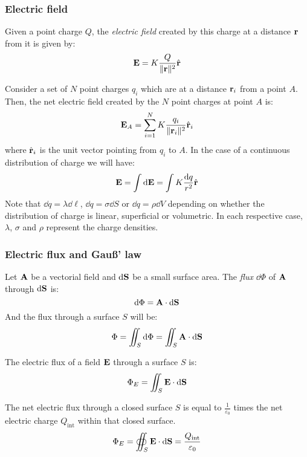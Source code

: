 \documentclass[../../../main.tex]{subfiles}
\begin{document}
\begin{multicols}{2}
  \subsubsection{Electric field}
  \begin{definition}
    Given a point charge $Q$, the \emph{electric field} created by this charge at a distance $\boldsymbol{\mathrm{r}}$ from it is given by:
    $$\boldsymbol{\mathrm{E}}=K\frac{Q}{\|\boldsymbol{\mathrm{r}}\|^2}\hat{\boldsymbol{\mathrm{r}}}$$
  \end{definition}
  \begin{principle}
    Consider a set of $N$ point charges $q_i$ which are at a distance $\boldsymbol{\mathrm{r}}_i$ from a point $A$. Then, the net electric field created by the $N$ point charges at point $A$ is:
    $$\boldsymbol{\mathrm{E}}_A=\sum_{i=1}^NK\frac{q_i}{\|\boldsymbol{\mathrm{r}}_{i}\|^2}\hat{\boldsymbol{\mathrm{r}}}_{i}$$ where $\hat{\boldsymbol{\mathrm{r}}}_{i}$ is the unit vector pointing from $q_i$ to $A$. In the case of a continuous distribution of charge we will have:
    $$\boldsymbol{\mathrm{E}}=\int\dd{\boldsymbol{\mathrm{E}}}=\int K\frac{\dd{q}}{r^2}\hat{\boldsymbol{\mathrm{r}}}$$
    Note that $\dd{q}=\lambda\dd{\ell}$, $\dd{q}=\sigma\dd{S}$ or $\dd{q}=\rho\dd{V}$ depending on whether the distribution of charge is linear, superficial or volumetric. In each respective case, $\lambda$, $\sigma$ and $\rho$ represent the charge densities.
  \end{principle}
  \subsubsection{Electric flux and Gau\ss' law}
  \begin{definition}
    Let $\boldsymbol{\mathrm{A}}$ be a vectorial field and $\dd{\boldsymbol{\mathrm{S}}}$ be a small surface area. The \emph{flux} $\dd{\Phi}$ of $\boldsymbol{\mathrm{A}}$ through $\dd{\boldsymbol{\mathrm{S}}}$ is:
    $$\dd{\Phi}=\boldsymbol{\mathrm{A}}\cdot\dd{\boldsymbol{\mathrm{S}}}$$ And the flux through a surface $S$ will be:
    $$\Phi=\iint_S \dd{\Phi}=\iint_S\boldsymbol{\mathrm{A}}\cdot \dd{\boldsymbol{\mathrm{S}}}$$
  \end{definition}
  \begin{corollary}
    The electric flux of a field $\boldsymbol{\mathrm{E}}$ through a surface $S$ is:
    $$\Phi_E=\iint_S\boldsymbol{\mathrm{E}}\cdot \dd{\boldsymbol{\mathrm{S}}}$$
  \end{corollary}
  \begin{law}
    The net electric flux through a closed surface $S$ is equal to $\frac{1}{\varepsilon_0}$ times the net electric charge $Q_\text{int}$ within that closed surface.
    $$\Phi_E=\oiint_S\boldsymbol{\mathrm{E}}\cdot\dd{\boldsymbol{\mathrm{S}}}=\frac{Q_\text{int}}{\varepsilon_0}$$
  \end{law}

\end{multicols}
\end{document}
